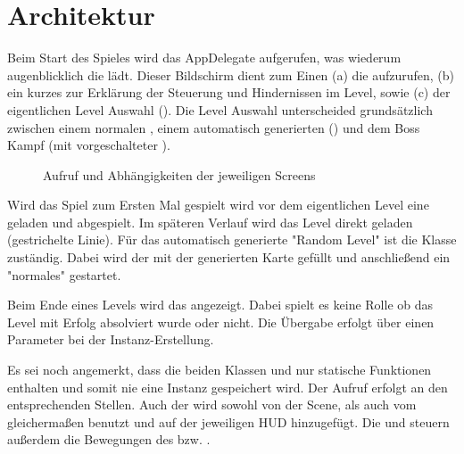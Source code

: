 \chapter{Architektur}\label{ch:arch}

\label{sec:3_Spielstruktur}

Beim Start des Spieles wird das AppDelegate aufgerufen, was wiederum augenblicklich die  lädt. Dieser Bildschirm dient zum Einen (a) die  aufzurufen, (b) ein kurzes  zur Erklärung der Steuerung und Hindernissen im Level, sowie (c) der eigentlichen Level Auswahl ().
Die Level Auswahl unterscheided grundsätzlich zwischen einem normalen , einem automatisch generierten () und dem Boss Kampf (mit vorgeschalteter ).

\begin{figure}[H]
\scalebox{0.7}{}
\caption{Aufruf und Abhängigkeiten der jeweiligen Screens}
\label{calltree}
\end{figure}


Wird das Spiel zum Ersten Mal gespielt wird vor dem eigentlichen Level eine  geladen und abgespielt. Im späteren Verlauf wird das Level direkt geladen (gestrichelte Linie).
Für das automatisch generierte "Random Level" ist die  Klasse zuständig. Dabei wird der  mit der generierten Karte gefüllt und anschließend ein "normales"  gestartet.

Beim Ende eines Levels wird das  angezeigt. Dabei spielt es keine Rolle ob das Level mit Erfolg absolviert wurde oder nicht. Die Übergabe erfolgt über einen Parameter bei der Instanz-Erstellung.

Es sei noch angemerkt, dass die beiden Klassen  und  nur statische Funktionen enthalten und somit nie eine Instanz gespeichert wird. Der Aufruf erfolgt an den entsprechenden Stellen.
Auch der  wird sowohl von der  Scene, als auch vom  gleichermaßen benutzt und auf der jeweiligen HUD hinzugefügt. Die  und  steuern außerdem die Bewegungen des  bzw. .

